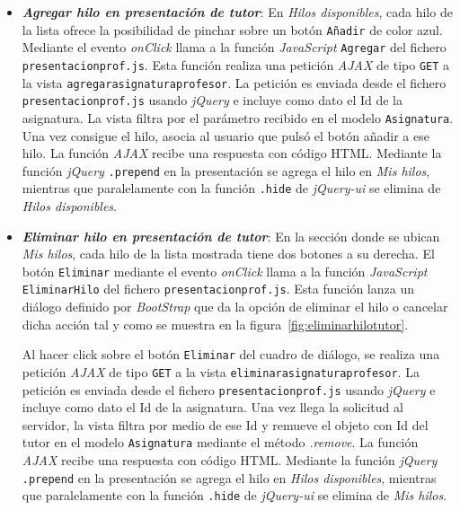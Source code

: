 \documentclass[a4paper, 12pt]{book}
\begin{document}
\begin{itemize}
  \item {\bfseries \textit{Agregar hilo en presentaci\'on de tutor}}: En \textit{Hilos disponibles}, cada hilo de la lista ofrece la posibilidad de pinchar 
  sobre un bot\'on \texttt{A\~nadir} de color azul. Mediante el evento \textit{onClick} llama a la funci\'on \textit{JavaScript} \texttt{Agregar} del 
  fichero \texttt{presentacionprof.js}. Esta funci\'on realiza una petici\'on \textit{AJAX} de tipo \texttt{GET} a la vista 
  \texttt{agregarasignaturaprofesor}. La petici\'on es enviada desde el fichero \texttt{presentacionprof.js} usando \textit{jQuery} e incluye como dato el 
  Id de la asignatura. La vista filtra por el par\'ametro recibido en el modelo \texttt{Asignatura}. Una vez consigue el hilo, asocia al usuario que 
  puls\'o el bot\'on a\~nadir a ese hilo. La funci\'on \textit{AJAX} recibe una respuesta con c\'odigo HTML. Mediante la funci\'on \textit{jQuery} 
  \texttt{.prepend} en la presentaci\'on se agrega el hilo en \textit{Mis hilos}, mientras que paralelamente con la funci\'on \texttt{.hide} de 
  \textit{jQuery-ui} se elimina de \textit{Hilos disponibles}.

  \item {\bfseries \textit{Eliminar hilo en presentaci\'on de tutor}}: En la secci\'on donde se ubican \textit{Mis hilos}, cada hilo de la lista mostrada 
  tiene dos botones a su derecha. El bot\'on \texttt{Eliminar} mediante el evento \textit{onClick} llama a la funci\'on \textit{JavaScript} 
  \texttt{EliminarHilo} del fichero \texttt{presentacionprof.js}. Esta funci\'on lanza un di\'alogo definido por \textit{BootStrap} que da la opci\'on de
  eliminar el hilo o cancelar dicha acci\'on tal y como se muestra en la figura~\ref{fig:eliminarhilotutor}. 
  
  Al hacer click sobre el bot\'on \texttt{Eliminar} del cuadro de di\'alogo, se realiza una petici\'on \textit{AJAX} de tipo \texttt{GET} a la vista 
  \texttt{eliminarasignaturaprofesor}. La petici\'on es enviada desde el fichero \texttt{presentacionprof.js} usando \textit{jQuery} e incluye como dato el 
  Id de la asignatura. Una vez llega la solicitud al servidor, la vista filtra por medio de ese Id y remueve el objeto con Id del tutor en el modelo
  \texttt{Asignatura} mediante el m\'etodo \textit{.remove}. La funci\'on \textit{AJAX} recibe una respuesta con c\'odigo HTML. Mediante la funci\'on 
  \textit{jQuery} \texttt{.prepend} en la presentaci\'on se agrega el hilo en \textit{Hilos disponibles}, mientras que paralelamente con la funci\'on 
  \texttt{.hide} de \textit{jQuery-ui} se elimina de \textit{Mis hilos}.
  

\end{itemize}
\end{document}
